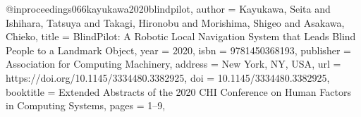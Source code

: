 @inproceedings{066kayukawa2020blindpilot,
author = {Kayukawa, Seita and Ishihara, Tatsuya and Takagi, Hironobu and Morishima, Shigeo and Asakawa, Chieko},
title = {BlindPilot: A Robotic Local Navigation System that Leads Blind People to a Landmark Object},
year = {2020},
isbn = {9781450368193},
publisher = {Association for Computing Machinery},
address = {New York, NY, USA},
url = {https://doi.org/10.1145/3334480.3382925},
doi = {10.1145/3334480.3382925},
booktitle = {Extended Abstracts of the 2020 CHI Conference on Human Factors in Computing Systems},
pages = {1–9},
}